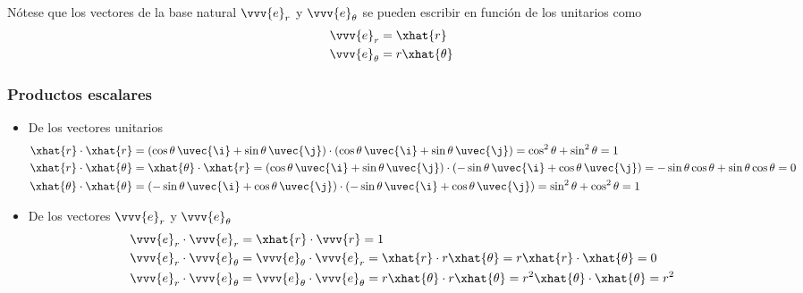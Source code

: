 Nótese que los vectores de la base natural $\vvv{e}_r$ y $\vvv{e}_\theta$ se pueden
escribir en función de los unitarios como
\begin{subequations}
\begin{align}
  \vvv{e}_r &= \xhat{r}\\
  \vvv{e}_\theta &= r\xhat{\theta}
\end{align}
\end{subequations}

\subsubsection{Productos escalares}
\begin{itemize}
\item De los vectores unitarios
{\small
\begin{subequations}
  \begin{align}
    \xhat{r}\cdot\xhat{r}
    &=
      (\cos\theta\,\uvec{\i}+\sin\theta\,\uvec{\j})
      \cdot
      (\cos\theta\,\uvec{\i}+\sin\theta\,\uvec{\j})
      = \cos^2\theta + \sin^2\theta = 1\\
    \xhat{r}\cdot\xhat{\theta}
    &=
      \xhat{\theta}\cdot\xhat{r}
      = (\cos\theta\,\uvec{\i}+\sin\theta\,\uvec{\j})
      \cdot
      (-\sin\theta\,\uvec{\i}+\cos\theta\,\uvec{\j})
      = -\sin\theta\cos\theta + \sin\theta\cos\theta = 0\\
    \xhat{\theta}\cdot\xhat{\theta}
    &=
      (-\sin\theta\,\uvec{\i}+\cos\theta\,\uvec{\j})
      \cdot
      (-\sin\theta\,\uvec{\i}+\cos\theta\,\uvec{\j})
      = \sin^2\theta + \cos^2\theta = 1
  \end{align}
\end{subequations}
}

\item De los vectores $\vvv{e}_r$ y $\vvv{e}_\theta$
\begin{subequations}
  \begin{align}\label{eq:R2-erer-productoescalar}
    \vvv{e}_r\cdot\vvv{e}_r
    &=
      \xhat{r}\cdot\vvv{r} = 1\\
    \label{eq:R2-eretheta-productoescalar}
    \vvv{e}_r\cdot\vvv{e}_\theta
    &=
      \vvv{e}_\theta\cdot\vvv{e}_r
      = \xhat{r}\cdot r\xhat{\theta} = r \xhat{r}\cdot\xhat{\theta} = 0\\
    \label{eq:R2-ethetaetheta-productoescalar}
    \vvv{e}_r\cdot\vvv{e}_\theta
    &=
      \vvv{e}_\theta\cdot\vvv{e}_\theta
      = r\xhat{\theta}\cdot r\xhat{\theta}
      = r^2 \xhat{\theta}\cdot\xhat{\theta} = r^2\\    
  \end{align}
\end{subequations}
\end{itemize}

